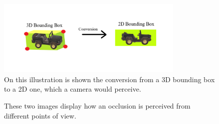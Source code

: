 \begin{figure} [h!]
    \centering
    \includegraphics[width=0.8\textwidth]{images/2D_bounding_boxes.png}
    \caption[3D bounding box conversion]{On this illustration is shown the conversion from a 3D bounding box to a 2D one, which a camera would perceive.}
    \label{fig:bb_conversion}
\end{figure}

\begin{figure} [h!]
  \centering
  \hfill
  \caption[Occlusion points of view]{These two images display how an occlusion is perceived from different points of view.} \label{fig:occlusion_views}
\end{figure}

\newpage
